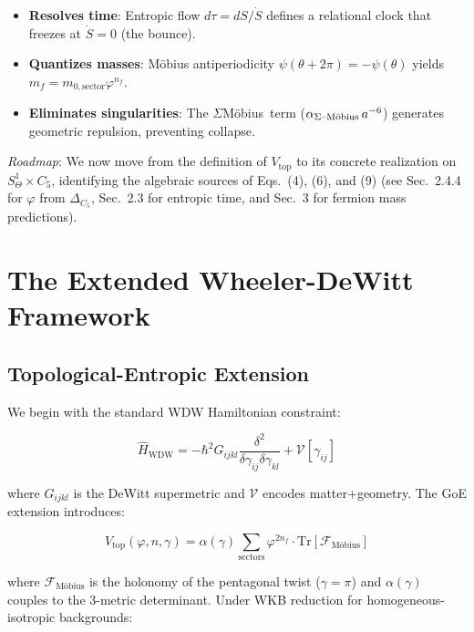 \documentclass[12pt]{article}
\theoremstyle{definition}
\theoremstyle{plain}
\newcommand{\Moebius}{M\"obius}
\newcommand{\SigMoeb}{\ensuremath{\Sigma}\text{--}\Moebius}
\newcommand{\StiffTerm}{\ensuremath{\alpha_{\text{\SigMoeb}}\, a^{-6}}}
\begin{document}
\begin{itemize}
\item \textbf{Resolves time}: Entropic flow $d\tau = dS/\dot{S}$ defines a relational clock that freezes at $\dot{S} = 0$ (the bounce).
\item \textbf{Quantizes masses}: M\"obius antiperiodicity $\psi(\theta+2\pi) = -\psi(\theta)$ yields $m_f = m_{0,\text{sector}} \varphi^{n_f}$.
\item \textbf{Eliminates singularities}: The \SigMoeb\ term ($\StiffTerm$) generates geometric repulsion, preventing collapse.
\end{itemize}

\vspace{0.3cm}
\noindent\textit{Roadmap}: We now move from the definition of $V_{\text{top}}$ to its concrete realization on $S^1_\Theta \times C_5$, identifying the algebraic sources of Eqs.~(4), (6), and (9) (see Sec.~2.4.4 for $\varphi$ from $\Delta_{C_5}$, Sec.~2.3 for entropic time, and Sec.~3 for fermion mass predictions).

\section{The Extended Wheeler-DeWitt Framework}

\subsection{Topological-Entropic Extension}

We begin with the standard WDW Hamiltonian constraint:

\begin{equation}
\hat{H}_{\text{WDW}} = -\hbar^2 G_{ijkl} \frac{\delta^2}{\delta\gamma_{ij}\delta\gamma_{kl}} + \mathcal{V}[\gamma_{ij}]
\end{equation}

where $G_{ijkl}$ is the DeWitt supermetric and $\mathcal{V}$ encodes matter+geometry. The GoE extension introduces:

\begin{equation}
V_{\text{top}}(\varphi, n, \gamma) = \alpha(\gamma) \sum_{\text{sectors}} \varphi^{2n_f} \cdot \text{Tr}[\mathcal{F}_{\text{M\"obius}}]
\end{equation}

where $\mathcal{F}_{\text{M\"obius}}$ is the holonomy of the pentagonal twist ($\gamma = \pi$) and $\alpha(\gamma)$ couples to the 3-metric determinant. Under WKB reduction for homogeneous-isotropic backgrounds:
\end{document}

